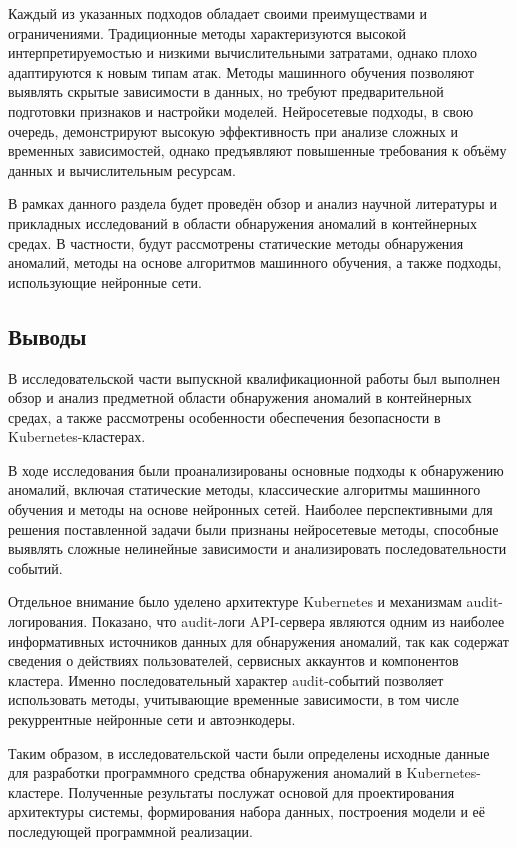 Каждый из указанных подходов обладает своими преимуществами и ограничениями. Традиционные методы характеризуются высокой интерпретируемостью и низкими вычислительными затратами, однако плохо адаптируются к новым типам атак. Методы машинного обучения позволяют выявлять скрытые зависимости в данных, но требуют предварительной подготовки признаков и настройки моделей. Нейросетевые подходы, в свою очередь, демонстрируют высокую эффективность при анализе сложных и временных зависимостей, однако предъявляют повышенные требования к объёму данных и вычислительным ресурсам.

В рамках данного раздела будет проведён обзор и анализ научной литературы и прикладных исследований в области обнаружения аномалий в контейнерных средах. В частности, будут рассмотрены статические методы обнаружения аномалий, методы на основе алгоритмов машинного обучения, а также подходы, использующие нейронные сети. 








\subsection{Выводы}

В исследовательской части выпускной квалификационной работы был выполнен обзор и анализ предметной области обнаружения аномалий в контейнерных средах, а также рассмотрены особенности обеспечения безопасности в Kubernetes-кластерах. 

В ходе исследования были проанализированы основные подходы к обнаружению аномалий, включая статические методы, классические алгоритмы машинного обучения и методы на основе нейронных сетей. Наиболее перспективными для решения поставленной задачи были признаны нейросетевые методы, способные выявлять сложные нелинейные зависимости и анализировать последовательности событий.

Отдельное внимание было уделено архитектуре Kubernetes и механизмам audit-логирования. Показано, что audit-логи API-сервера являются одним из наиболее информативных источников данных для обнаружения аномалий, так как содержат сведения о действиях пользователей, сервисных аккаунтов и компонентов кластера. Именно последовательный характер audit-событий позволяет использовать методы, учитывающие временные зависимости, в том числе рекуррентные нейронные сети и автоэнкодеры.

Таким образом, в исследовательской части были определены исходные данные для разработки программного средства обнаружения аномалий в Kubernetes-кластере. Полученные результаты послужат основой для проектирования архитектуры системы, формирования набора данных, построения модели и её последующей программной реализации.